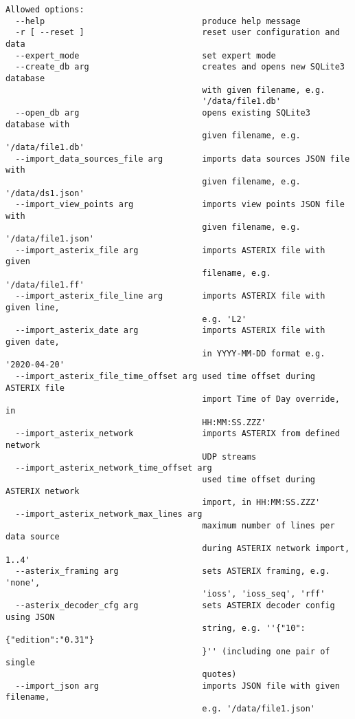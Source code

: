 \begin{lstlisting}
Allowed options:
  --help                                produce help message
  -r [ --reset ]                        reset user configuration and data
  --expert_mode                         set expert mode
  --create_db arg                       creates and opens new SQLite3 database 
                                        with given filename, e.g. 
                                        '/data/file1.db'
  --open_db arg                         opens existing SQLite3 database with 
                                        given filename, e.g. '/data/file1.db'
  --import_data_sources_file arg        imports data sources JSON file with 
                                        given filename, e.g. '/data/ds1.json'
  --import_view_points arg              imports view points JSON file with 
                                        given filename, e.g. '/data/file1.json'
  --import_asterix_file arg             imports ASTERIX file with given 
                                        filename, e.g. '/data/file1.ff'
  --import_asterix_file_line arg        imports ASTERIX file with given line, 
                                        e.g. 'L2'
  --import_asterix_date arg             imports ASTERIX file with given date, 
                                        in YYYY-MM-DD format e.g. '2020-04-20'
  --import_asterix_file_time_offset arg used time offset during ASTERIX file 
                                        import Time of Day override, in 
                                        HH:MM:SS.ZZZ'
  --import_asterix_network              imports ASTERIX from defined network 
                                        UDP streams
  --import_asterix_network_time_offset arg
                                        used time offset during ASTERIX network
                                        import, in HH:MM:SS.ZZZ'
  --import_asterix_network_max_lines arg
                                        maximum number of lines per data source
                                        during ASTERIX network import, 1..4'
  --asterix_framing arg                 sets ASTERIX framing, e.g. 'none', 
                                        'ioss', 'ioss_seq', 'rff'
  --asterix_decoder_cfg arg             sets ASTERIX decoder config using JSON 
                                        string, e.g. ''{"10":{"edition":"0.31"}
                                        }'' (including one pair of single 
                                        quotes)
  --import_json arg                     imports JSON file with given filename, 
                                        e.g. '/data/file1.json'

\end{lstlisting}
